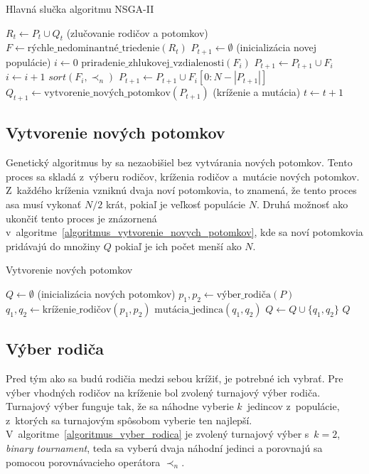 \begin{algorithm}[h]\label{algoritmus_nsga2}
\caption{Hlavná slučka algoritmu NSGA-II}
  $R_t \gets P_t \cup Q_t$ (zlučovanie rodičov a potomkov)\;
  $F \gets \text{rýchle\_nedominantné\_triedenie}(R_t)$\;
  $P_{t+1} \gets \emptyset$ (inicializácia novej populácie)\;
  $i \gets 0$\;
   {
    $\text{priradenie\_zhlukovej\_vzdialenosti}(F_i)$\;
    $P_{t+1} \gets P_{t+1} \cup F_i$\;
    $i \gets i + 1$\;
  }
  $sort(F_i, \prec_n)$\;
  $P_{t+1} \gets P_{t+1} \cup F_i[0:N - |P_{t+1}|]$\;
  $Q_{t+1} \gets \text{vytvorenie\_nových\_potomkov}(P_{t+1})$ (kríženie a mutácia)\;
  $t \gets t + 1$\;
\end{algorithm}

\subsection*{Vytvorenie nových potomkov}
Genetický algoritmus by sa nezaobišiel bez vytvárania nových potomkov.
Tento proces sa skladá z~výberu rodičov, kríženia rodičov a~mutácie nových potomkov.
Z~každého kríženia vzniknú dvaja noví potomkovia, to znamená, že tento proces asa musí vykonať $N/2$ krát, pokiaľ je veľkosť populácie $N$.
Druhá možnosť ako ukončiť tento proces je znázornená v~algoritme~\ref{algoritmus_vytvorenie_novych_potomkov}, kde sa noví potomkovia pridávajú do množiny $Q$ pokiaľ je ich počet menší ako $N$.

\begin{algorithm}[h]\label{algoritmus_vytvorenie_novych_potomkov}
\caption{Vytvorenie nových potomkov}
  $Q \gets \emptyset$ (inicializácia nových potomkov)\;
   {
    $p_1, p_2 \gets \text{výber\_rodiča}(P)$\;
    $q_1, q_2 \gets \text{kríženie\_rodičov}(p_1, p_2)$\;
    $\text{mutácia\_jedinca}(q_1, q_2)$\;
    $Q \gets Q \cup \{q_1, q_2\}$\;
  }
  \Return $Q$\;
\end{algorithm}

\subsection*{Výber rodiča}
Pred tým ako sa budú rodičia medzi sebou krížiť, je potrebné ich vybrať.
Pre výber vhodných rodičov na kríženie bol zvolený turnajový výber rodiča.
Turnajový výber funguje tak, že sa náhodne vyberie $k$~jedincov z~populácie, z~ktorých sa turnajovým spôsobom vyberie ten najlepší.
V~algoritme~\ref{algoritmus_vyber_rodica} je zvolený turnajový výber s~$k = 2$, \textit{binary tournament}, teda sa vyberú dvaja náhodní jedinci a porovnajú sa pomocou porovnávacieho operátora $\prec_n$.

